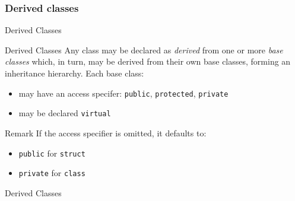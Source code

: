 \subsubsection{Derived classes}

\begin{frame}{Derived Classes}{}
  \begin{block}{Derived Classes}
    Any class may be declared as \emph{derived} from one or more \emph{base classes} which, in turn, may be derived from their own base classes, forming an inheritance hierarchy. Each base class:
    \begin{itemize}
    \item
      may have an access specifer: \lstinline!public!, \lstinline!protected!, \lstinline!private!
    \item
      may be declared \lstinline!virtual!
    \end{itemize}
  \end{block}

  \begin{block}{Remark}
    If the access specifier is omitted, it defaults to:
    \begin{itemize}
    \item
      \lstinline!public! for \lstinline!struct!
    \item
      \lstinline!private! for \lstinline!class!
    \end{itemize}
  \end{block}
\end{frame}

\begin{frame}{Derived Classes}{}
  \begin{example}
  \end{example}
\end{frame}



